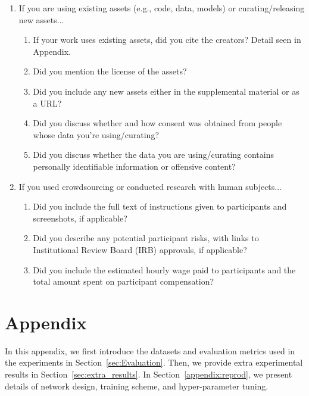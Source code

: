 \documentclass{article}
\begin{document}
\begin{enumerate}
\item If you are using existing assets (e.g., code, data, models) or curating/releasing new assets...
\begin{enumerate}
  \item If your work uses existing assets, did you cite the creators?
    \answerYes{} Detail seen in Appendix. 
  \item Did you mention the license of the assets?
    \answerYes{}
  \item Did you include any new assets either in the supplemental material or as a URL?
    \answerNo{}
  \item Did you discuss whether and how consent was obtained from people whose data you're using/curating?
    \answerNA{}
  \item Did you discuss whether the data you are using/curating contains personally identifiable information or offensive content?
    \answerNA{}
\end{enumerate}


\item If you used crowdsourcing or conducted research with human subjects...
\begin{enumerate}
  \item Did you include the full text of instructions given to participants and screenshots, if applicable?
    \answerNA{}
  \item Did you describe any potential participant risks, with links to Institutional Review Board (IRB) approvals, if applicable?
    \answerNA{}
  \item Did you include the estimated hourly wage paid to participants and the total amount spent on participant compensation?
    \answerNA{}
\end{enumerate}


\end{enumerate}

\appendix
\section*{Appendix}


\setcounter{secnumdepth}{2}

In this appendix, we first introduce the datasets and evaluation metrics used in the experiments in Section~\ref{sec:Evaluation}. Then,
we provide extra experimental results in Section~\ref{sec:extra_results}. In Section~\ref{appendix:reprod}, we present details of network design, training scheme, and hyper-parameter tuning. 
\end{document}
